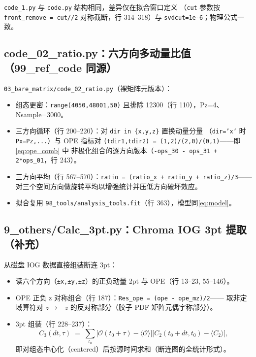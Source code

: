 \documentclass[UTF8,11pt]{ctexart}
\begin{document}
\texttt{code\_1.py} 与 \texttt{code.py} 结构相同，差异仅在拟合窗口定义
（\texttt{cut} 参数按 \texttt{front\_remove = cut//2} 对称截断，行 314--318）与
\texttt{svdcut=1e-6}；物理公式一致。

\subsection{code\_02\_ratio.py：六方向多动量比值（99\_ref\_code 同源）}
\label{sec:code_02_ratio}

\texttt{03\_bare\_matrix/code\_02\_ratio.py}（裸矩阵元版本）：
\begin{itemize}
  \item 组态更密：\texttt{range(4050,48001,50)} 且排除 12300（行 110），Pz=4、Nsample=3000。
  \item 三方向循环（行 200--220）：对 \texttt{dir in \{x,y,z\}} 置换动量分量
  （\texttt{dir='x'} 时 \texttt{Px=Pz,...}）与 OPE 指标对
  \texttt{(tdir1,tdir2) = (1,2)/(2,0)/(0,1)}——即 \eqref{eq:ope_comb} 中
  非极化组合的逐方向版本（\texttt{-ops\_30 - ops\_31 + 2*ops\_01}，行 243）。
  \item 三方向平均（行 567--570）：\texttt{ratio = (ratio\_x + ratio\_y + ratio\_z)/3}——
  对三个空间方向做旋转平均以增强统计并压低方向破坏效应。
  \item 拟合复用 \texttt{98\_tools/analysis\_tools.fit}（行 363），模型同\eqref{eq:model}。
\end{itemize}

\subsection{9\_others/Calc\_3pt.py：Chroma IOG 3pt 提取（补充）}
\label{sec:calc3pt}

从磁盘 IOG 数据直接组装断连 3pt：
\begin{itemize}
  \item 读六个方向（\texttt{±x,±y,±z}）的正负动量 2pt 与 OPE（行 13--23, 55--146）。
  \item OPE 正负 z 对称组合（行 187）：\texttt{Res\_ope = (ope - ope\_mz)/2}——
  取非定域算符对 $z\to -z$ 的反对称部分（胶子 PDF 矩阵元偶宇称部分）。
  \item 3pt 组装（行 228--237）：
  \begin{equation*}
    C_3(dt,\tau)\;=\;\sum_{t_0}\Big[\mathcal O(t_0+\tau) - \langle\mathcal O\rangle\Big]
    \Big[C_2(t_0+dt,t_0) - \langle C_2\rangle\Big],
  \end{equation*}
  即对组态中心化（centered）后按源时间求和（断连图的全统计形式）。
\end{itemize}
\end{document}
